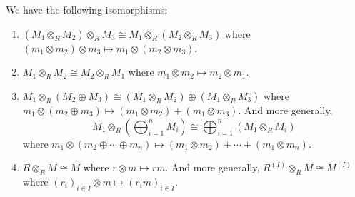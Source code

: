 \begin{proposition} We have the following isomorphisms:
    \begin{enumerate}
        \item $(M_1 \otimes_R M_2) \otimes_R M_3 \cong M_1 \otimes_R (M_2 \otimes_R M_3)$ where $(m_1 \otimes m_2) \otimes m_3 \mapsto m_1 \otimes (m_2 \otimes m_3)$.
        \item $M_1 \otimes_R M_2 \cong M_2 \otimes_R M_1$ where $m_1 \otimes m_2 \mapsto m_2 \otimes m_1$.
        \item $M_1 \otimes_R (M_2 \oplus M_3) \cong (M_1 \otimes_R M_2) \oplus (M_1 \otimes_R M_3)$ where $m_1 \otimes (m_2 \oplus m_3) \mapsto (m_1 \otimes m_2) + (m_1 \otimes m_3)$. And more generally,
              \[
                  M_1 \otimes_R (\bigoplus_{i=1}^n M_i) \cong \bigoplus_{i=1}^n (M_1 \otimes_R M_i)
              \]
              where $m_1 \otimes (m_2 \oplus \cdots \oplus m_n) \mapsto (m_1 \otimes m_2) + \cdots + (m_1 \otimes m_n)$.
        \item $R \otimes_R M \cong M$ where $r \otimes m \mapsto rm$. And more generally, $R^{(I)} \otimes_R M \cong M^{(I)}$ where $(r_i)_{i\in I} \otimes m \mapsto (r_i m)_{i\in I}$.
    \end{enumerate}
\end{proposition}

